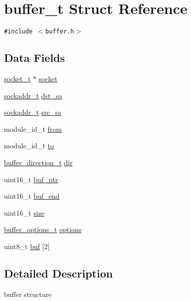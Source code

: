 \hypertarget{structbuffer__t}{
\section{buffer\_\-t Struct Reference}
\label{structbuffer__t}
}
{\tt \#include $<$buffer.h$>$}

\subsection*{Data Fields}
\begin{CompactItemize}
\item 
\hyperlink{structsocket__t}{socket\_\-t} $\ast$ \hyperlink{structbuffer__t_b3d08149c91ea5c32d3808dfc369708c}{socket}
\item 
\hyperlink{structsockaddr__t}{sockaddr\_\-t} \hyperlink{structbuffer__t_77292f1f1beee8363cf331027cd4f76a}{dst\_\-sa}
\item 
\hyperlink{structsockaddr__t}{sockaddr\_\-t} \hyperlink{structbuffer__t_a93121920765652ba07cf01351cea7c2}{src\_\-sa}
\item 
module\_\-id\_\-t \hyperlink{structbuffer__t_57786381935d453fb5f30d6c7a0fd149}{from}
\item 
module\_\-id\_\-t \hyperlink{structbuffer__t_655f0a9f1662c7386e350d55b0ebe804}{to}
\item 
\hyperlink{buffer_8h_584321097d4e6c6a37198fbbb6d76c71}{buffer\_\-direction\_\-t} \hyperlink{structbuffer__t_90c0669e859280525c9a16dc1d1a6153}{dir}
\item 
uint16\_\-t \hyperlink{structbuffer__t_435b821b8f73bc752e5ed8b0edec6a2d}{buf\_\-ptr}
\item 
uint16\_\-t \hyperlink{structbuffer__t_93697fa152d62c9539dcd5b2f42b5d1d}{buf\_\-end}
\item 
uint16\_\-t \hyperlink{structbuffer__t_71b3f12052a171249ae6ad4e08e93ec4}{size}
\item 
\hyperlink{structbuffer__options__t}{buffer\_\-options\_\-t} \hyperlink{structbuffer__t_49d73f996520c91c472dd68bc7005e70}{options}
\item 
uint8\_\-t \hyperlink{structbuffer__t_ed0f8f327664a6eea8d419fd852a0b46}{buf} \mbox{[}2\mbox{]}
\end{CompactItemize}


\subsection{Detailed Description}
buffer structure 



